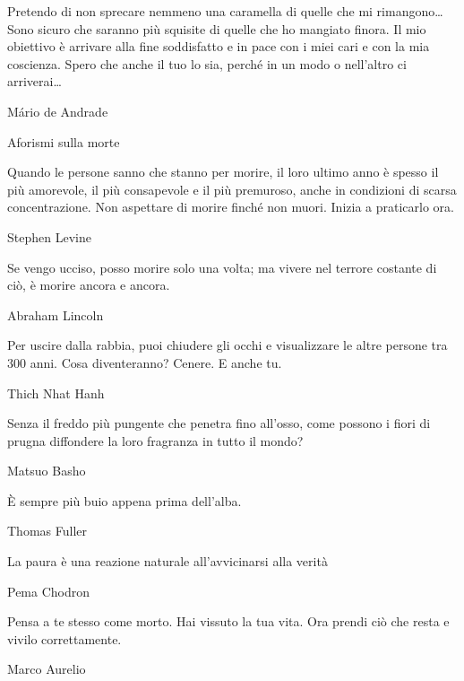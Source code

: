 \documentclass[12pt]{book} %
\begin{document}
\begin{mdframed}[linewidth=1pt]
\bigskip

Pretendo di non sprecare nemmeno una caramella di quelle che mi rimangono… Sono sicuro che saranno più squisite di
quelle che ho mangiato finora. Il mio obiettivo è arrivare alla fine soddisfatto e in pace con i miei cari e con la mia
coscienza. Spero che anche il tuo lo sia, perché in un modo o nell'altro ci arriverai…


\bigskip

Mário de Andrade
\end{mdframed}

\bigskip

\begin{mdframed}[linewidth=1pt]
Aforismi sulla morte


\bigskip

Quando le persone sanno che stanno per morire, il loro ultimo anno è spesso il più amorevole, il più consapevole e il
più premuroso, anche in condizioni di scarsa concentrazione. Non aspettare di morire finché non muori. Inizia a
praticarlo ora.

Stephen Levine


\bigskip

Se vengo ucciso, posso morire solo una volta; ma vivere nel terrore costante di ciò, è morire ancora e ancora.

Abraham Lincoln 


\bigskip

Per uscire dalla rabbia, puoi chiudere gli occhi e visualizzare le altre persone tra 300 anni. Cosa diventeranno?
Cenere. E anche tu.

Thich Nhat Hanh


\bigskip

Senza il freddo più pungente che penetra fino all'osso, come possono i fiori di prugna diffondere la loro fragranza in
tutto il mondo?

Matsuo Basho


\bigskip

È sempre più buio appena prima dell'alba.

Thomas Fuller


\bigskip

La paura è una reazione naturale all'avvicinarsi alla verità

Pema Chodron


\bigskip

Pensa a te stesso come morto. Hai vissuto la tua vita. Ora prendi ciò che resta e vivilo correttamente.

Marco Aurelio



\end{mdframed}
\end{document}
